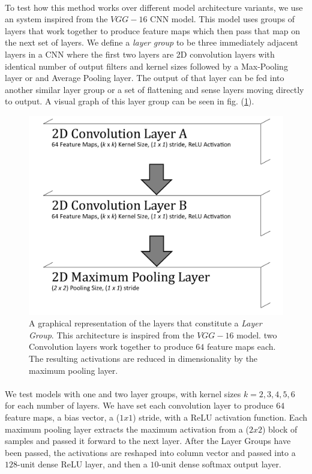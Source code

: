 \documentclass[12pt,letterpaper]{article}
\begin{document}
\paragraph*{}To test how this method works over different model architecture variants, we use an system inspired from the $VGG-16$ CNN model. This model uses groups of layers that work together to produce feature maps which then pass that map on the next set of layers. We define a \textit{layer group} to be three immediately adjacent layers in a CNN where the first two layers are 2D convolution layers with identical number of output filters and kernel sizes followed by a Max-Pooling layer or and Average Pooling layer. The output of that layer can be fed into another similar layer group or a set of flattening and sense layers moving directly to output. A visual graph of this layer group can be seen in fig. (\ref{Layer Group}).

\begin{figure}[h]
\label{Layer Group}
\begin{center}
\includegraphics[scale=0.5]{CNN_LayerGroup}
\end{center}
\caption{A graphical representation of the layers that constitute a \textit{Layer Group}. This architecture is inspired from the $VGG-16$ model. two Convolution layers work together to produce $64$ feature maps each. The resulting activations are reduced in dimensionality by the maximum pooling layer.}
\end{figure}

\paragraph*{}We test models with one and two layer groups, with kernel sizes $k = 2,3,4,5,6$ for each number of layers. We have set each convolution layer to produce $64$ feature maps, a bias vector, a ($1 x 1$) stride, with a ReLU activation function. Each maximum pooling layer extracts the maximum activation from a ($2 x 2$) block of samples and passed it forward to the next layer. After the Layer Groups have been passed, the activations are reshaped into column vector and passed into a $128$-unit dense ReLU layer, and then a $10$-unit dense softmax output layer.
\end{document}
